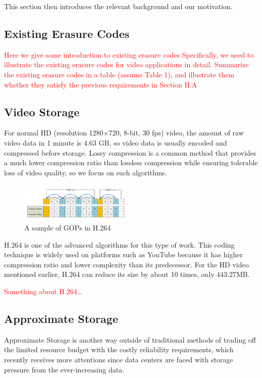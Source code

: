\documentclass[sigconf]{acmart}
\begin{document}
This section then introduces the relevant background and our motivation.

\subsection{Existing Erasure Codes}

\textcolor{red}{Here we give some introduction to existing erasure codes
Specifically, we need to illustrate the existing erasure codes for video applications in detail.
Summarize the existing erasure codes in a table (assume Table 1), and illustrate them whether they satisfy the previous requirements in Section II.A}

\subsection{Video Storage}\label{video storage}
For normal HD (resolution 1280$\times$720, 8-bit, 30 fps) video, the amount of raw video data in 1 minute is 4.63 GB, so video data is usually encoded and compressed before storage. Lossy compression is a common method that provides a much lower compression ratio than lossless compression while ensuring tolerable loss of video quality, so we focus on such algorithms. 

\begin{figure}[ht]
\centering
\includegraphics[width=0.48\textwidth]{photo/H264_IPB.pdf}
\caption{A sample of GOPs in H.264}
\label{H264-IPB}
\end{figure}

H.264 is one of the advanced algorithms for this type of work. This coding technique is widely used on platforms such as YouTube because it has higher compression ratio and lower complexity than its predecessor. For the HD video mentioned earlier, H.264 can reduce its size by about 10 times, only 443.27MB.

\textcolor{red}{Something about H.264\dots}

\subsection{Approximate Storage}
Approximate Storage is another way outside of traditional methods of trading off the limited resource budget with the costly reliability requirements, which recently receives more attentions since data centers are faced with storage pressure from the ever-increasing data.
\end{document}
